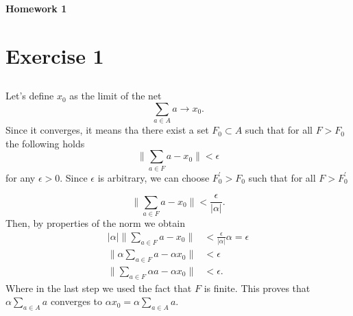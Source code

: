 \documentclass[a4paper,12pt]{article} %
\begin{document}
\begin{center} %
    {\Large \bf Homework 1}
\end{center}

\vspace{0.4cm}


\onehalfspacing
\section{Exercise 1}
\subsection{}
Let's define \(x_0\) as the limit of the net
\begin{equation}
    \sum_{a \in  A}a \to x_0.
\end{equation}
Since it converges, it means tha there exist a set \(F_0 \subset A\) such that for all \(F > F_0\) the following holds
\begin{equation}
    \| \sum_{a \in  F}a - x_0  \| < \epsilon
\end{equation}
for any \(\epsilon >0\). Since \(\epsilon \) is arbitrary, we can choose \(F^{\prime} _0> F_0\) such that for all \(F > F_0^{\prime} \)

\begin{equation}
    \| \sum_{a \in  F}a - x_0  \| < \frac{\epsilon}{|\alpha| }.
\end{equation}
Then, by properties of the norm we obtain
\begin{align*}
    \vert \alpha \vert \| \sum_{a \in  F}a - x_0  \| & < \frac{\epsilon}{|\alpha| }\alpha = \epsilon \\
    \| \alpha \sum_{a \in  F}a - \alpha x_0  \|      & < \epsilon                                    \\
    \|  \sum_{a \in  F}\alpha a - \alpha x_0  \|     & < \epsilon.
\end{align*}
Where in the last step we used the fact that \(F\) is finite.
This proves that \(\alpha \sum_{a \in  A} a\) converges to \(\alpha x_0 = \alpha \sum_{a \in  A} a \).
\end{document}

